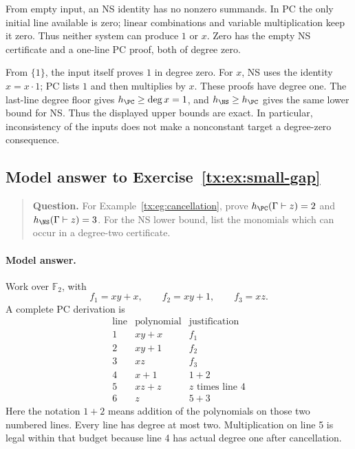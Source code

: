 From empty input, an NS identity has no nonzero summands. In PC the
only initial line available is zero; linear combinations and variable
multiplication keep it zero. Thus neither system can produce \(1\)
or \(x\). Zero has the empty NS certificate and a one-line PC proof,
both of degree zero.

From \(\{1\}\), the input itself proves \(1\) in degree zero.
For \(x\), NS uses the identity \(x=x\cdot1\); PC lists \(1\) and
then multiplies by \(x\). These proofs have degree one. The last-line
degree floor gives \(h_{\PC}\ge\deg x=1\), and
\(h_{\NS}\ge h_{\PC}\) gives the same lower bound for NS.
Thus the displayed upper bounds are exact. In particular, inconsistency
of the inputs does not make a nonconstant target a degree-zero consequence.


\par


\begin{samepage}

\subsection*{Model answer to Exercise~\ref{tx:ex:small-gap}}\label{tx:ans:small-gap}

\begin{quote}\small\textbf{Question.} For Example~\ref{tx:eg:cancellation}, prove
$h_{\PC}(\Gamma\vdash z)=2$ and
$h_{\NS}(\Gamma\vdash z)=3$. For the NS lower bound, list the monomials
which can occur in a degree-two certificate.
\end{quote}

\paragraph{Model answer.}
Work over \(\mathbb F_2\), with
\[
 f_1=xy+x,\qquad f_2=xy+1,\qquad f_3=xz.
\]
A complete PC derivation is
\[
 \begin{array}{c|l|l}
 \text{line}&\text{polynomial}&\text{justification}\\ \hline
 1&xy+x&f_1\\
 2&xy+1&f_2\\
 3&xz&f_3\\
 4&x+1&1+2\\
 5&xz+z&z\text{ times line }4\\
 6&z&5+3
 \end{array}
\]
Here the notation \(1+2\) means addition of the polynomials on those
two numbered lines. Every line has degree at most two. Multiplication
on line 5 is legal within that budget because line 4 has actual
degree one after cancellation.
\end{samepage}

